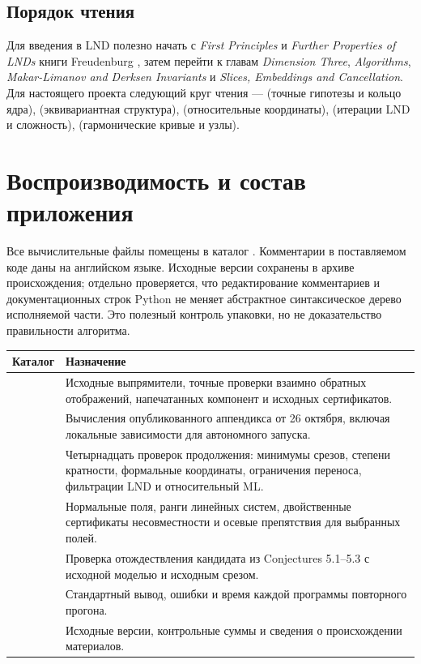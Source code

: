 \subsection*{Порядок чтения}
Для введения в LND полезно начать с \emph{First Principles} и
\emph{Further Properties of LNDs} книги Freudenburg \cite{Freudenburg},
затем перейти к главам \emph{Dimension Three}, \emph{Algorithms},
\emph{Makar-Limanov and Derksen Invariants} и
\emph{Slices, Embeddings and Cancellation}. Для настоящего проекта
следующий круг чтения --- \cite{vdER} (точные гипотезы и кольцо ядра),
\cite{Masuda} (эквивариантная структура), \cite{EVM} (относительные
координаты), \cite{DG} (итерации LND и сложность),
\cite{FF,KP} (гармонические кривые и узлы).

\section{Воспроизводимость и состав приложения}

Все вычислительные файлы помещены в каталог .
Комментарии в поставляемом коде даны на английском языке. Исходные
версии сохранены в архиве происхождения; отдельно проверяется, что
редактирование комментариев и документационных строк Python не
меняет абстрактное синтаксическое дерево исполняемой части.
Это полезный контроль упаковки, но не доказательство правильности
алгоритма.

\begin{longtable}{L{0.29\textwidth}L{0.65\textwidth}}
\toprule Каталог & Назначение \\ \midrule
\endhead
{} & Исходные выпрямители, точные проверки взаимно
обратных отображений, напечатанных компонент и исходных сертификатов.\\[5pt]
 & Вычисления опубликованного аппендикса
от 26 октября, включая локальные зависимости для автономного запуска.\\[5pt]
 & Четырнадцать проверок продолжения: минимумы
срезов, степени кратности, формальные координаты, ограничения
переноса, фильтрации LND и относительный ML.\\[5pt]
 & Нормальные поля, ранги линейных систем, двойственные
сертификаты несовместности и осевые препятствия для выбранных полей.\\[5pt]
 & Проверка отождествления кандидата из
Conjectures 5.1--5.3 с исходной моделью и исходным срезом.\\[5pt]
 & Стандартный вывод, ошибки и время
каждой программы повторного прогона.\\[5pt]
 & Исходные версии, контрольные суммы и сведения
о происхождении материалов.\\
\bottomrule
\end{longtable}

